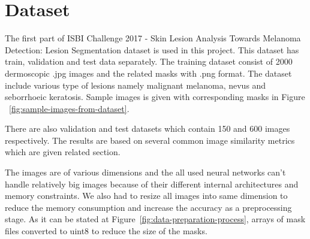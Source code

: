 \section{Dataset}\label{sec:dataset}

The first part of ISBI Challenge 2017 \cite{codella2018skin} - Skin Lesion Analysis Towards Melanoma Detection: Lesion Segmentation dataset is used in this project.
This dataset has train, validation and test data separately. The training dataset consist of 2000 dermoscopic .jpg images and the related masks with .png format.
The dataset include various type of lesions namely malignant melanoma, nevus and seborrhoeic keratosis.
Sample images is given with corresponding masks in Figure ~\ref{fig:sample-images-from-dataset}.



There are also validation and test datasets which contain 150 and 600 images respectively.
The results are based on several common image similarity metrics which are given related section.



The images are of various dimensions and the all used neural networks can't handle relatively big images because of their different internal architectures and memory constraints.
We also had to resize all images into same dimension to reduce the memory consumption and increase the accuracy as a preprocessing stage.
As it can be stated at Figure~\ref{fig:data-preparation-process}, arrays of mask files converted to uint8 to reduce the size of the masks.
